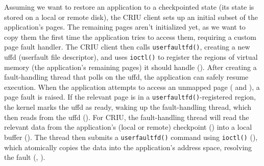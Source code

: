 Assuming we want to restore an application to a checkpointed state (\ie its state is stored on a local or remote disk), the CRIU client sets up an initial subset of the application's pages. The remaining pages aren't initialized yet, as we want to copy them the first time the application tries to access them, requiring a custom page fault handler. The CRIU client then calls \texttt{userfaultfd()}, creating a new uffd (userfault file descriptor), and uses \texttt{ioctl()} to register the regions of virtual memory (the application's remaining pages) it should handle (). After creating a fault-handling thread that polls on the uffd, the application can safely resume execution.
When the application attempts to access an unmapped page ( and ), a page fault is raised. If the relevant page is in a \texttt{userfaultfd()}-registered region, the kernel marks the uffd as ready, waking up the fault-handling thread, which then reads from the uffd (). For CRIU, the fault-handling thread will read the relevant data from the application's (local or remote) checkpoint () into a local buffer (). The thread then submits a \texttt{userfaultfd()} command using \texttt{ioctl()} (), which atomically copies the data into the application's address space, resolving the fault (, ).



